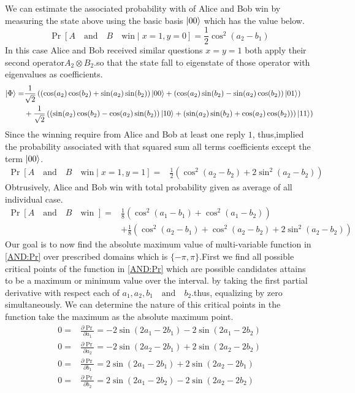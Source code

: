 We can estimate the associated probability with of Alice and Bob win by measuring the state above using the basic basis  $\ket{00}$ which has the value below.
$$\Pr[A\quad \text{and}\quad B \quad \text{win}\mid   x=1 ,y=0]=\frac{1}{2}\cos^2(a_2-b_1)$$
In this case Alice and Bob received similar questions $ x=y=1$ both apply their second operator$A_2\otimes B_2$.so that the state fall to eigenstate of those operator with eigenvalues as coefficients.
\begin{align*}
\ket{\Phi}=&\frac{1}{\sqrt{2}}\left( \left(\cos(a_2) \cos(b_2) +\sin(a_2) \sin(b_2)\right)\ket{00}  +\left(\cos(a_2) \sin(b_2) -\sin(a_2) \cos(b_2)\right)\ket{01}\right)\\
&+\frac{1}{\sqrt{2}}\left(\left(\sin(a_2) \cos(b_2)-\cos(a_2) \sin(b_2)\right)\ket{10} +\left(\sin(a_2) \sin(b_2)+\cos(a_2) \cos(b_2) )\right)\ket{11}\right)
\end{align*}
Since the winning require from Alice and Bob at least one reply $1$, thus,implied the probability associated with that squared sum all terms  coefficients except  the term $\ket{00}$.
\begin{align*}
\Pr[A\quad \text{and}\quad B \quad \text{win}\mid   x=1 ,y=1]=&\frac{1}{2} \left(\cos^2(a_2-b_2)+2 \sin^2(a_2-b_2)\right)
\end{align*}
Obtrusively, Alice and Bob win with total probability given as average of all individual case.
\begin{align}\label{AND:Pr}
\Pr[A\quad \text{and}\quad B \quad \text{win }  ]=&\frac{1}{8}\left( \cos^2(a_1-b_1)+\cos^2(a_1-b_2)\right)\nonumber\\
&+\frac{1}{8}\left(\cos^2(a_2-b_1)+\cos^2(a_2-b_2)+2\sin^2(a_2-b_2)\right)
\end{align}
Our goal is to now find the absolute maximum  value of multi-variable function in \ref{AND:Pr} over prescribed domains which is $\{-\pi,\pi\}$.First we find  all possible critical points of the function in \ref{AND:Pr} which are possible candidates  attains to be a maximum or minimum value over the interval. by taking the first partial derivative with respect each of $a_1,a_2,b_1 \quad \text{and} \quad b_2$.thus, equalizing by zero simultaneously. We can determine the nature of this critical points in the function take the maximum as the absolute maximum point.
\begin{align}
0=&\frac{\partial \Pr}{\partial a_1}=-2\sin(2a_1-2b_1)- 2\sin(2a_1-2b_2)\label{Q:1}\\
0=&\frac{\partial \Pr}{\partial a_2}=-2\sin(2a_2-2b_1)+2\sin(2a_2-2b_2)\label{Q:2}\\
0=&\frac{\partial \Pr}{\partial b_1}=2\sin(2a_1-2b_1)+ 2\sin(2a_2-2b_1)\label{Q:3}\\
0=&\frac{\partial \Pr}{\partial b_2}=2\sin(2a_1-2b_2)- 2\sin(2a_2-2b_2)\label{Q:4}
\end{align}
